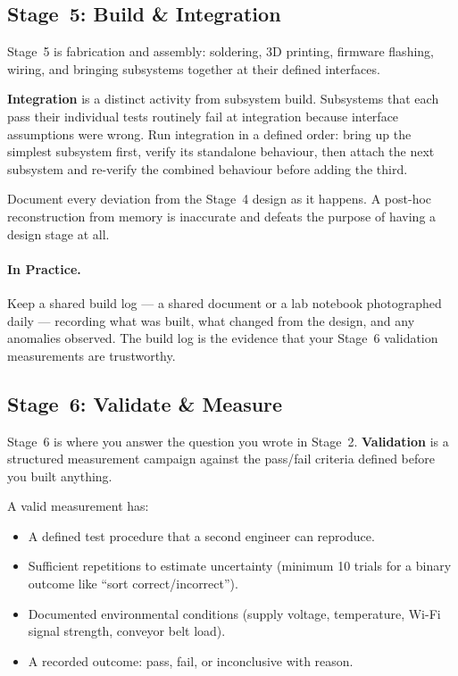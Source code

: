\subsection{Stage~5: Build \& Integration}
\label{sec:ch2-stage5}

Stage~5 is fabrication and assembly: soldering, 3D printing, firmware
flashing, wiring, and bringing subsystems together at their defined
interfaces.

\textbf{Integration} is a distinct activity from
subsystem build.
Subsystems that each pass their individual tests routinely fail at
integration because interface assumptions were wrong.
Run integration in a defined order: bring up the simplest subsystem first,
verify its standalone behaviour, then attach the next subsystem and re-verify
the combined behaviour before adding the third.

Document every deviation from the Stage~4 design as it happens.
A post-hoc reconstruction from memory is inaccurate and defeats the purpose
of having a design stage at all.

\paragraph{In Practice.}
Keep a shared build log --- a shared document or a lab notebook photographed
daily --- recording what was built, what changed from the design, and any
anomalies observed.
The build log is the evidence that your Stage~6 validation measurements are
trustworthy.

\subsection{Stage~6: Validate \& Measure}
\label{sec:ch2-stage6}

Stage~6 is where you answer the question you wrote in Stage~2.
\textbf{Validation} is a structured measurement campaign
against the pass/fail criteria defined before you built anything.

A valid measurement has:
\begin{itemize}
  \item A defined test procedure that a second engineer can reproduce.
  \item Sufficient repetitions to estimate uncertainty
        (minimum 10 trials for a binary outcome like ``sort correct/incorrect'').
  \item Documented environmental conditions (supply voltage, temperature,
        Wi-Fi signal strength, conveyor belt load).
  \item A recorded outcome: pass, fail, or inconclusive with reason.
\end{itemize}

